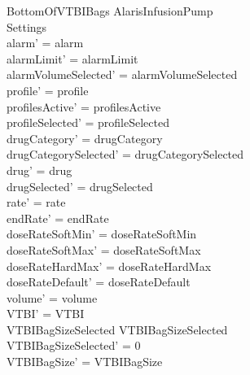 \begin{schema}{BottomOfVTBIBags}
	\Delta AlarisInfusionPump\\
	Settings\\
	\where
	alarm' = alarm\\
	alarmLimit' = alarmLimit\\
	alarmVolumeSelected' = alarmVolumeSelected\\
	profile' = profile\\
	profilesActive' = profilesActive\\  
	profileSelected' = profileSelected\\
	drugCategory' = drugCategory\\ drugCategorySelected' = drugCategorySelected\\
	drug' = drug\\ drugSelected' = drugSelected\\
	rate' = rate\\
	endRate' = endRate\\
	doseRateSoftMin' = doseRateSoftMin\\
	doseRateSoftMax' = doseRateSoftMax\\
	doseRateHardMax' = doseRateHardMax\\
	\pagebreak 
	doseRateDefault' = doseRateDefault\\
	volume' = volume\\
	VTBI' = VTBI\\
	VTBIBagSizeSelected  \land VTBIBagSizeSelected \\
	VTBIBagSizeSelected' = 0\\
	VTBIBagSize' = VTBIBagSize\\

\end{schema}

